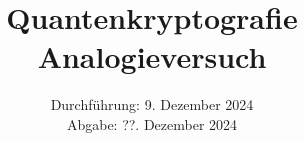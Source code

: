 

\subject{\texorpdfstring{\vspace{2ex}}{}V00\texorpdfstring{\vspace{-2ex}}{}} %
\title{Quantenkryptografie Analogieversuch} %
\date{
	Durchführung: 9. Dezember 2024 %
	\\ Abgabe: ??. Dezember 2024 %
}





\maketitle
\thispagestyle{empty}

\tableofcontents
\newpage








\printbibliography{}


